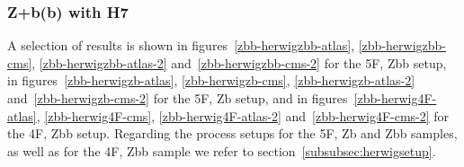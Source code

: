 \documentclass[11pt]{cernrep}
\newcommand{\Herwig}{H\protect\scalebox{0.8}{ERWIG}7\xspace}
\begin{document}
\subsubsection{Z+b(b) with \Herwig}
\label{sec:ZHerwig}

A selection of results is shown in figures~\ref{zbb-herwigzbb-atlas},
\ref{zbb-herwigzbb-cms}, \ref{zbb-herwigzbb-atlas-2}
and~\ref{zbb-herwigzbb-cms-2} for the 5F, Zbb setup,
in figures~\ref{zbb-herwigzb-atlas}, \ref{zbb-herwigzb-cms},
\ref{zbb-herwigzb-atlas-2} and~\ref{zbb-herwigzb-cms-2} for the 5F, Zb
setup,
and in figures~\ref{zbb-herwig4F-atlas}, \ref{zbb-herwig4F-cms},
\ref{zbb-herwig4F-atlas-2} and~\ref{zbb-herwig4F-cms-2} for the 4F,
Zbb setup.
Regarding the process setups for the 5F, Zb and Zbb samples, as well as for the
4F, Zbb sample we refer to section~\ref{subsubsec:herwigsetup}.
\end{document}
